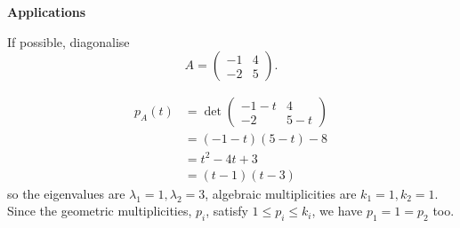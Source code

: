 \documentclass[10pt, a4paper]{article}
\begin{document}
\textbf{Applications}
\begin{example}
    If possible,
    diagonalise
    \[
    A = \begin{pmatrix}
        -1 & 4 \\ -2 & 5
    \end{pmatrix}.
    \]
    \begin{solution}
        \begin{align*}
            p_A(t) &= \det\begin{pmatrix}
                -1 - t & 4 \\ -2 & 5 - t
            \end{pmatrix} \\
            &= (-1 - t)(5 - t) - 8 \\
            &= t ^ 2 - 4t + 3 \\
            &= (t - 1)(t - 3)
        \end{align*}
        so the eigenvalues are $\lambda_1 = 1, \lambda_2 = 3$,
        algebraic multiplicities are $k_1 = 1, k_2 = 1$.
        Since the geometric multiplicities,
        $p_i$,
        satisfy $1 \leq p_i \leq k_i$,
        we have $p_1 = 1 = p_2$ too.

        \begin{center}
        \end{center}
        \hfill


\end{solution}
\end{example}
\end{document}

